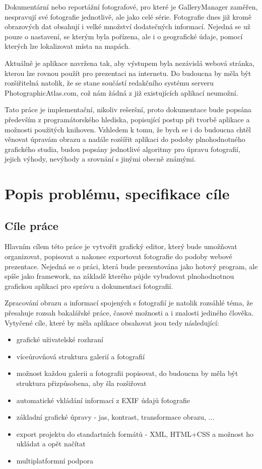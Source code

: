 \documentclass[11pt,twoside,a4paper]{book}
\begin{document}
\indent
Dokumentární nebo reportážní fotografové, pro které je GalleryManager zaměřen, nespravují své fotografie jednotlivě, ale jako celé série. Fotografie dnes již kromě obrazových dat obsahují i velké množství dodatečných informací. Nejedná se už pouze o nastavení, se kterým byla pořízena, ale i o geografické údaje, pomocí kterých lze lokalizovat místa na mapách.

\indent
Aktuálně je aplikace navržena tak, aby výstupem byla nezávislá webová stránka, kterou lze rovnou použít pro prezentaci na internetu. Do budoucna by měla být rozšiřitelná natolik, že se stane součástí redakčního systému serveru PhotographicAtlas.com, což nám žádná z již existujících aplikací neumožní.

\indent
Tato práce je implementační, nikoliv rešeršní, proto dokumentace bude popsána především z programátorského hlediska, popisující postup při tvorbě aplikace a možnosti použitých knihoven. Vzhledem k tomu, že bych se i do budoucna chtěl věnovat úpravám obrazu a nadále rozšířit aplikaci do podoby plnohodnotného grafického studia, budou popsány jednotlivé algoritmy pro úpravu fotografií, jejich výhody, nevýhody a srovnání s jinými obecně známými.


\chapter{Popis problému, specifikace cíle}
\section{Cíle práce}

\noindent
Hlavním cílem této práce je vytvořit grafický editor, který bude umožňovat organizovat, popisovat a nakonec exportovat fotografie do podoby webové prezentace. Nejedná se o práci, která bude prezentována jako hotový program, ale spíše jako framework, na základě kterého půjde vybudovat plnohodnotnou grafickou aplikaci pro správu a dokumentaci fotografií.

\indent
Zpracování obrazu a informací spojených s fotografií je natolik rozsáhlé téma, že přesahuje rozsah bakalářské práce, časové možnosti a i znalosti jediného člověka. Vytyčené cíle, které by měla aplikace obsahovat jsou tedy následující:

\begin{itemize}
\item grafické uživatelské rozhraní
\item víceúrovňová struktura galerií a fotografií
\item možnost každou galerii a fotografii popisovat, do budoucna by měla být struktura přizpůsobena, aby šla rozšiřovat
\item automatické vkládání informací z EXIF údajů fotografie
\item základní grafické úpravy - jas, kontrast, transformace obrazu, ...
\item export projektu do standartních formátů - XML, HTML+CSS a možnost ho ukládat a opět načítat
\item multiplatformní podpora
\end{itemize}
\end{document}
